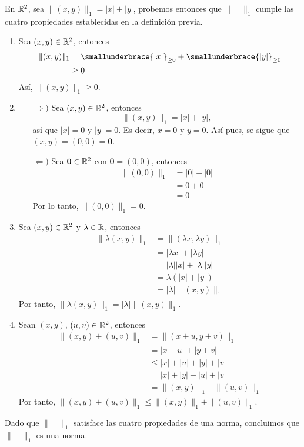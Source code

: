 \begin{definition}
    En $\RR[2]$, sea $\| (x, y) \|_1 = |x| + |y|$, probemos entonces que $\| \quad \|_1$ cumple las cuatro propiedades establecidas en la definición previa.
    \begin{enumerate}[label=\roman*.]
        \item Sea $(x, y) \in \RR[2]$, entonces
        \begin{align*}
            \| (x, y) \|_1 & = \smallunderbrace{|x|}_{\geq 0} + \smallunderbrace{|y|}_{\geq 0} \\
            & \geq 0
        \end{align*}
        Así, $\| (x, y) \|_1 \geq 0$.
        \item \begin{enumerate}
            \item[$\Rightarrow)$] Sea $(x, y) \in \RR[2]$, entonces
            $$\| (x, y) \|_1 = |x| + |y|,$$
            así que $|x| = 0$ y $|y| = 0$. Es decir, $x = 0$ y $y = 0$. Así pues, se sigue que $(x, y) = (0, 0) = \mathbf{0}$.
            \item[$\Leftarrow)$] Sea $\mathbf{0} \in \RR[2]$ con $\mathbf{0} = (0, 0)$, entonces
            \begin{align*}
                \| (0, 0) \|_1 & = |0| + |0| \\
                & = 0 + 0 \\
                & = 0
            \end{align*}
            Por lo tanto, $\| (0, 0) \|_1 = 0$.
        \end{enumerate}
        \item Sea $(x, y) \in \RR[2]$ y $\lambda \in \RR$, entonces
        \begin{align*}
            \| \lambda (x, y) \|_1 & = \| (\lambda x, \lambda y) \|_1 \\
            & = |\lambda x| + |\lambda y| \\
            & = |\lambda| |x| + |\lambda| |y| \\
            & = \lambda \left( |x| + |y| \right) \\
            & = |\lambda| \| (x, y) \|_1
        \end{align*}
        Por tanto, $\| \lambda (x, y) \|_1 = |\lambda| \| (x, y) \|_1$.
        \item Sean $(x, y)$, $(u, v) \in \RR[2]$, entonces
        \begin{align*}
            \| (x, y) + (u, v) \|_1 & = \| (x + u, y + v) \|_1 \\
            & = |x + u| + |y + v| \\
            & \leq |x| + |u| + |y| + |v| \\
            & = |x| + |y| + |u| + |v| \\
            & = \| (x, y) \|_1 + \| (u, v) \|_1
        \end{align*}
        Por tanto, $\| (x, y) + (u, v) \|_1 \leq \| (x, y) \|_1 + \| (u, v) \|_1$.
    \end{enumerate}
    Dado que $\| \quad \|_1$ satisface las cuatro propiedades de una norma, concluimos que  $\| \quad \|_1$ es una norma.
\end{definition}

